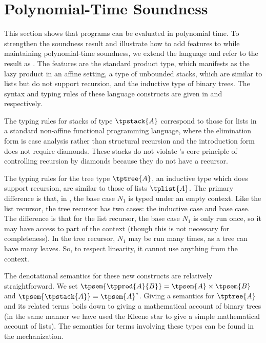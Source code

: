 \section{Polynomial-Time Soundness}
\label{sec:soundness}
\enlargethispage{\baselineskip}

This section shows that \lfpl programs can be evaluated in polynomial
time.
%
To strengthen the soundness result and illustrate how to add features to \lfpl while maintaining polynomial-time soundness, we extend the language and refer to the result as \lfplplus. The features are the standard product type, which manifests as the lazy product in an affine setting, a type of unbounded stacks, which are similar to lists but do not support recursion, and the inductive type of binary trees. The syntax and typing rules of these language constructs are given in  and  respectively.

The typing rules for stacks of type $\tpstack{A}$ correspond to those for lists in a standard non-affine functional programming language, where the elimination form is case analysis rather than structural recursion and the introduction form does not require diamonds.
%
These stacks do not violate \lfpl's core principle of controlling recursion by diamonds because they do not have a recursor.

The typing rules for the tree type $\tptree{A}$, an inductive type which does support recursion, are similar to those of lists $\tplist{A}$. The primary difference is that, in , the base case $N_1$ is typed under an empty context. Like the list recursor, the tree recursor has two cases: the inductive case and base case. The difference is that for the list recursor, the base case $N_1$ is only run once, so it may have access to part of the context (though this is not necessary for completeness). In the tree recursor, $N_1$ may be run many times, as a tree can have many leaves. So, to respect linearity, it cannot use anything from the context.

The denotational semantics for these new constructs are relatively straightforward. We set $\tpsem{\tpprod{A}{B}} = \tpsem{A} \times \tpsem{B}$ and $\tpsem{\tpstack{A}} = \tpsem{A}^*$. Giving a semantics for $\tptree{A}$ and its related terms boils down to giving a mathematical account of binary trees (in the same manner we have used the Kleene star to give a simple mathematical account of lists).
%
The semantics for terms involving these types can be found in the mechanization.

